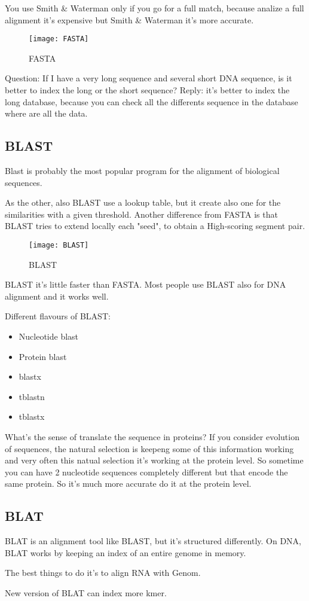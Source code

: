 You use Smith \& Waterman only if you go for a full match, because analize a
full alignment it's expensive but Smith \& Waterman it's more accurate.

\begin{figure}[H]
  \centering
  \texttt{[image: FASTA]}
  \caption{FASTA}
\end{figure}

Question: If I have a very long sequence and several short DNA sequence, is it
better to index the long or the short sequence? Reply: it's better to index
the long database, because you can check all the differents sequence in the
database where are all the data.

\subsection{BLAST}

Blast is probably the most popular program for the alignment of biological
sequences.

As the other, also BLAST use a lookup table, but it create also one for the
similarities with a given threshold. Another difference from FASTA is that
BLAST tries to extend locally each "seed", to obtain a High-scoring segment
pair.

\begin{figure}[H]
  \centering
  \texttt{[image: BLAST]}
  \caption{BLAST}
\end{figure}

BLAST it's little faster than FASTA. Most people use BLAST also for DNA
alignment and it works well.

Different flavours of BLAST:
\begin{itemize}
  \item Nucleotide blast
  \item Protein blast
  \item blastx
  \item tblastn
  \item tblastx
\end{itemize}

What's the sense of translate the sequence in proteins? If you consider
evolution of sequences, the natural selection is keepeng some of this
information working and very often this natual selection it's working at the
protein level. So sometime you can have 2 nucleotide sequences completely
different but that encode the same protein. So it's much more accurate do it at
the protein level.

\subsection{BLAT}

BLAT is an alignment tool like BLAST, but it's structured differently. On DNA,
BLAT works by keeping an index of an entire genome in memory.

The best things to do it's to align RNA with Genom.

New version of BLAT can index more kmer.
